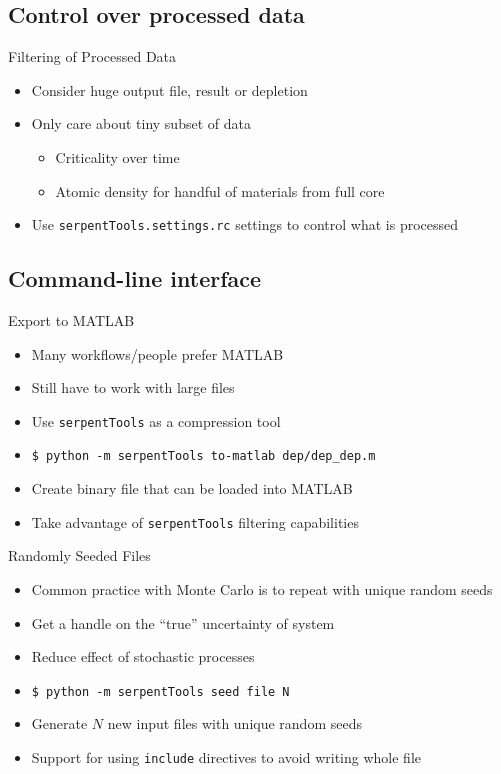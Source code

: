 \documentclass{beamer}
\newcommand{\st}{\texttt{serpentTools} }
\begin{document}
\subsection{Control over processed data}

\begin{frame}{Filtering of Processed Data}
    \begin{itemize}
        \item Consider huge output file, result or depletion
        \item Only care about tiny subset of data
        \begin{itemize}
            \item Criticality over time
            \item Atomic density for handful of materials from full core
        \end{itemize}
    \item Use \texttt{serpentTools.settings.rc} settings to control what is processed
    \end{itemize}
\end{frame}

\subsection{Command-line interface}

\begin{frame}{Export to MATLAB}
    \begin{itemize}
        \item Many workflows/people prefer MATLAB
        \item Still have to work with large files
        \item Use \st as a compression tool
        \item \texttt{\$ python -m serpentTools to-matlab dep/dep\_dep.m}
        \item Create binary file that can be loaded into MATLAB
        \item Take advantage of \st filtering capabilities
    \end{itemize}
\end{frame}

\begin{frame}{Randomly Seeded Files}
    \begin{itemize}
        \item Common practice with Monte Carlo is to repeat with unique random seeds
        \item Get a handle on the ``true'' uncertainty of system
        \item Reduce effect of stochastic processes
        \item \texttt{\$ python -m serpentTools seed file N}
        \item Generate $N$ new input files with unique random seeds
        \item Support for using \texttt{include} directives to avoid writing whole file
    \end{itemize}
\end{frame}
\end{document}
